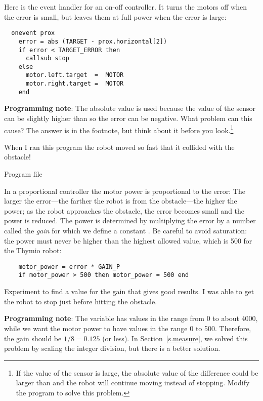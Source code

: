 Here is the event handler for an on-off controller. It turns the motors
off when the error is small, but leaves them at full power when the
error is large:

\newpage

\begin{verbatim}
  onevent prox
    error = abs (TARGET - prox.horizontal[2])
    if error < TARGET_ERROR then
      callsub stop
    else
      motor.left.target  =  MOTOR
      motor.right.target =  MOTOR
    end
\end{verbatim}

\textbf{Programming note}: The absolute value is used because the value
of the sensor can be slightly higher than  so the error can be
negative. What problem can this cause? The answer is in the footnote,
but think about it before you look.\footnote{If the value of the sensor
is large, the absolute value of the difference could be larger than
 and the robot will continue moving instead of
stopping. Modify the program to solve this problem.}

When I ran this program the robot moved so fast that it collided with
the obstacle!


{\raggedleft \hfill Program file }

In a proportional controller the motor power is proportional to the
error: The larger the error---the farther the robot is from the
obstacle---the higher the power; as the robot approaches the obstacle,
the error becomes small and the power is reduced. The power is
determined by multiplying the error by a number called the \emph{gain}
for which we define a constant . Be careful to avoid
saturation: the power must never be higher than the highest allowed
value, which is 500 for the Thymio robot:

\begin{verbatim}
    motor_power = error * GAIN_P
    if motor_power > 500 then motor_power = 500 end
\end{verbatim}

Experiment to find a value for the gain that gives good results. I was
able to get the robot to stop just before hitting the obstacle.

\textbf{Programming note}: The variable  has values in the
range from 0 to about 4000, while we want the motor power to have values
in the range 0 to 500. Therefore, the gain should be $1/8 = 0.125$ (or
less). In Section~\ref{s.measure}, we solved this problem by scaling
the integer division, but there is a better solution.

